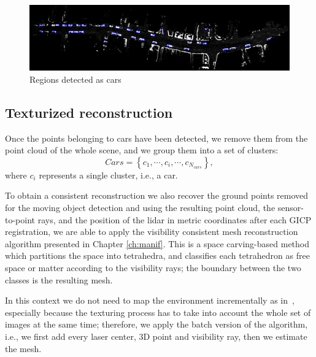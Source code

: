\begin{figure}[tp]
 \centering
 \includegraphics[width=0.98\columnwidth]{./img/ch-laser/drawing.png}
 \caption{Regions detected as cars}
 \label{fig:drawing}
\end{figure}



\subsection{Texturized reconstruction}
Once the points belonging to cars have been detected, we remove them from the point cloud of the whole scene, and we group them into a set of clusters:
\begin{equation}
Cars = \left\{c_1, \cdots, c_i, \cdots, c_{N_{cars}}  \right\},
\end{equation}
where $c_i$ represents a single cluster, i.e., a car.

To obtain a consistent reconstruction we also recover the ground points removed for the moving object detection and using the resulting point cloud, the sensor-to-point rays, and the position of the lidar in metric coordinates after each GICP registration, we are able to apply the visibility consistent mesh reconstruction algorithm presented in Chapter \ref{ch:manif}.
This is a space carving-based method which partitions the space into tetrahedra, and classifies each tetrahedron as free space or matter according to the visibility rays; the boundary between the two classes is the resulting mesh. 

In this context we do not need to map the environment incrementally as in~\cite{romanoni15b}, especially because the texturing process has to take into account the whole set of images at the same time; therefore, we apply the batch version of the algorithm, i.e., we first add every laser center, 3D point and visibility ray, then we estimate the mesh. 


